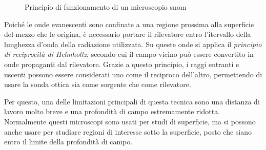 \documentclass[../main.tex]{subfiles}
\begin{document}
\begin{figure}[h]
	\centering
	\caption[Principio di funzionamento di un microscopio SNOM]{
		Principio di funzionamento di un microscopio \acrshort{snom}}
	\label{fig:asnom_diag}
\end{figure}

Poiché le onde evanescenti sono confinate a una regione prossima alla superficie del mezzo che le origina, è necessario portare il rilevatore entro l'itervallo della lunghezza d'onda della radiazione utilizzata. Su queste onde si applica il \textit{principio di reciprocità di Helmholtz}, secondo cui il campo vicino può essere convertito in onde propaganti dal rilevatore. Grazie a questo principio, i raggi entranti e uscenti possono essere considerati uno come il reciproco dell'altro, permettendo di usare la sonda ottica sia come sorgente che come rilevatore.\cite{hapke_1993}

Per questo, una delle limitazioni principali di questa tecnica sono una distanza di lavoro molto breve e una profondità di campo estremamente ridotta. Normalmente questi microscopi sono usati per studi di superficie, ma si possono anche usare per studiare regioni di interesse sotto la superficie, posto che siano entro il limite della profondità di campo.\cite{vobornik_2008}
\end{document}
